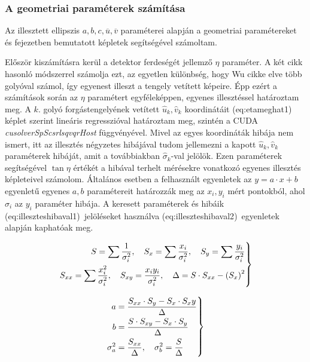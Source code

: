 \documentclass[a4paper,12pt]{article}
\begin{document}
\subsubsection{A geometriai paraméterek számítása}

Az illesztett ellipszis  $a,b,c,\overline{u},\overline{v}$ paraméterei alapján a geometriai paramétereket   és  fejezetben bemutatott képletek segítségével számoltam.

Először kiszámításra kerül a detektor ferdeségét jellemző $\eta$ paraméter. A két cikk hasonló módszerrel számolja ezt, az egyetlen különbség, hogy Wu cikke elve több golyóval számol, így egyenest illeszt a tengely vetített képeire. Épp ezért a számítások során az $\eta$ paramétert egyféleképpen, egyenes illesztéssel határoztam meg. A $k$. golyó forgástengelyének vetített  $\hat{u}_k, \hat{v}_k$ koordinátáit \aref({eq:etameghat1}) képlet szerint lineáris regresszióval határoztam meg, szintén a CUDA \emph{cusolverSpScsrlsqvqrHost} függvényével. Mivel az egyes koordináták hibája nem ismert, itt az illesztés négyzetes hibájával tudom jellemezni a kapott  $\hat{u}_k, \hat{v}_k$  paraméterek hibáját, amit a továbbiakban $\hat{\sigma}_k$-val jelölök.  Ezen paraméterek segítségével $\tan \eta$ értékét a hibával terhelt mérésekre vonatkozó egyenes illesztés képleteivel számolom. Általános esetben a felhasznált egyenletek az $y=a\cdot x + b$ egyenletű egyenes $a,b$ paramétereit határozzák meg az $x_i,y_i$ mért pontokból, ahol $\sigma_i$ az $y_i$ paraméter hibája. A keresett paraméterek és hibáik \aref({eq:illeszteshibaval1})~jelöléseket használva \aref({eq:illeszteshibaval2})~egyenletek alapján kaphatóak meg. 


\begin{equation}
\label{eq:illeszteshibaval1}
\left .
\begin{split}
S = \sum \frac{1}{\sigma_i^2}, \hskip10pt S_x = \sum \frac{x_i}{\sigma_i^2}, \hskip10pt S_y = \sum \frac{y_i}{\sigma_i^2} \\
 S_{xx} = \sum \frac{x_i^2}{\sigma_i^2}, \hskip10pt S_{xy} = \frac{x_iy_i}{\sigma_i^2}, \hskip10pt \Delta = S\cdot S_{xx}  - \left(S_x \right) ^2
 \end{split}
 \right \}
\end{equation}

\begin{equation}
\label{eq:illeszteshibaval2}
\left .
\begin{split}
a&=\frac{S_{xx} \cdot S_y - S_x \cdot S_xy }{\Delta}\\
b&=\frac{S\cdot S_{xy} - S_x \cdot S_y}{\Delta}\\
\sigma_a^2 & = \frac{S_{xx}}{\Delta },  \hskip10pt \sigma_b^2 = \frac{S}{\Delta}
\end{split}
\right \}
\end{equation}
\end{document}
